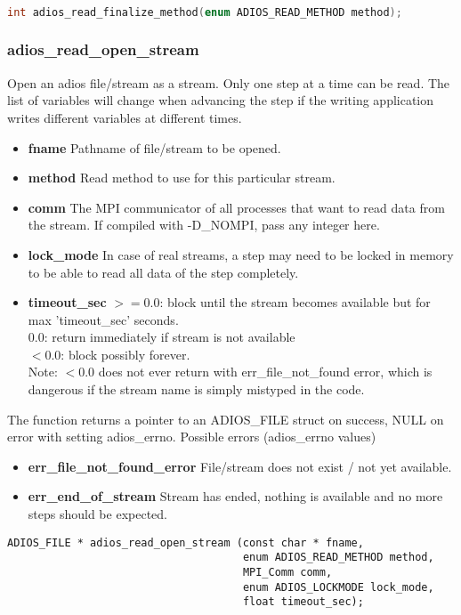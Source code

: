 \begin{lstlisting}[language=C,caption=Finalize a read method.]

int adios_read_finalize_method(enum ADIOS_READ_METHOD method);
\end{lstlisting}

\subsubsection*{adios\_read\_open\_stream}
Open an adios file/stream as a stream.
Only one step at a time can be read. The list of variables will change when
advancing the step if the writing application writes different variables at
different times. 

\begin{itemize}
\item{\bf fname}  Pathname of file/stream to be opened.
\item{\bf method}  Read method to use for this particular stream.
\item{\bf comm}    The MPI communicator of all processes that want to read data from the stream.
If compiled with -D\_NOMPI, pass any integer here.
\item{\bf lock\_mode} In case of real streams, a step may need to be locked in memory to be able
to read all data of the step completely.
\item{\bf timeout\_sec}  $>=0.0$: block until the stream becomes available but 
for max 'timeout\_sec' seconds.\\
$0.0$: return immediately if stream is not available\\
$<0.0$: block possibly forever.\\
Note: $<0.0$ does not ever return with err\_file\_not\_found error, 
which is dangerous if the stream name is simply mistyped in the code.
\end{itemize}
The function returns a pointer to an ADIOS\_FILE struct on success, NULL on error with setting adios\_errno. 
Possible errors (adios\_errno values)
\begin{itemize}
\item{\bf err\_file\_not\_found\_error}  File/stream does not exist / not yet available.
\item{\bf err\_end\_of\_stream}  Stream has ended, nothing is available and no more steps should be expected.
\end{itemize}


\begin{lstlisting}[language=ADIOS]
ADIOS_FILE * adios_read_open_stream (const char * fname, 
                                     enum ADIOS_READ_METHOD method, 
                                     MPI_Comm comm, 
                                     enum ADIOS_LOCKMODE lock_mode,
                                     float timeout_sec);
\end{lstlisting}

